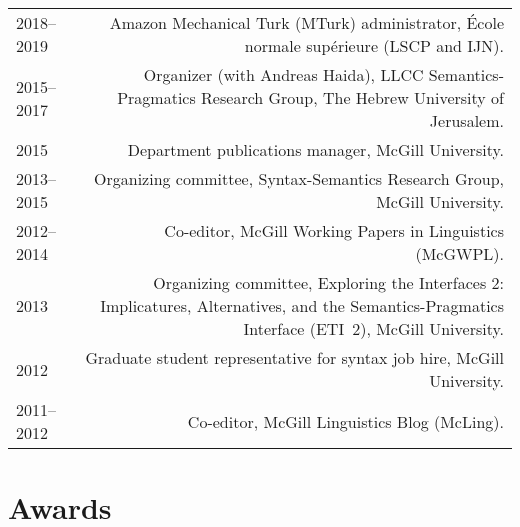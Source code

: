\documentclass[12pt,letterpaper,twoside]{article}
\makeatletter
\newenvironment{cvsection}{%
  \begin{longtable}[l]{@{}L@{} @{}R@{}}
}{%
  \end{longtable}
}
\makeatother
\begin{document}
\begin{cvsection}
  2018--2019 & Amazon Mechanical Turk (MTurk) administrator, École normale supérieure (LSCP and IJN).\\
  2015--2017 & Organizer (with Andreas Haida), LLCC Semantics-Pragmatics Research Group, The Hebrew University of Jerusalem.\\
  2015 & Department publications manager, McGill University.\\
  2013--2015 & Organizing committee, Syntax-Semantics Research Group, McGill University.\\
  2012--2014 & Co-editor, McGill Working Papers in Linguistics (McGWPL).\\
  2013 & Organizing committee, Exploring the Interfaces 2: Implicatures, Alternatives, and the Semantics-Pragmatics Interface (ETI~2), McGill University.\\
  2012 & Graduate student representative for syntax job hire, McGill University.\\
  2011--2012 & Co-editor, McGill Linguistics Blog (McLing).\\
\end{cvsection}

\section*{Awards}
\end{document}
